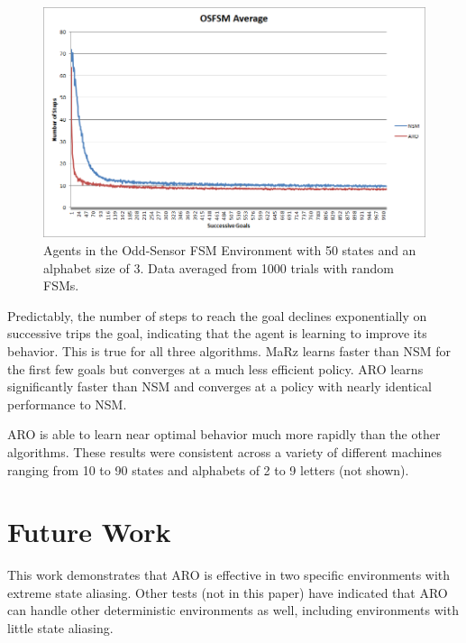 \documentclass[letterpaper]{article} %
\begin{document}
\begin{figure}[t]
	\centering
	\includegraphics[width=0.9\columnwidth]{OSFSMGraph.png} %
	\caption{Agents in the Odd-Sensor FSM Environment with 50 states and an alphabet size of 3. Data averaged from 1000 trials with random FSMs.}
	\label{fig5}
\end{figure}

Predictably, the number of steps to reach the goal declines
exponentially on successive trips the goal, indicating that the agent
is learning to improve its behavior.  This is true for all three
algorithms. MaRz learns faster than NSM for the first few goals but
converges at a much less efficient policy.  ARO learns significantly
faster than NSM and converges at a policy with nearly identical
performance to NSM.

ARO is able to learn near optimal behavior much more rapidly than the
other algorithms.  These results were consistent across a variety of
different machines ranging from 10 to 90 states and alphabets of 2 to
9 letters (not shown).

\section{Future Work}

This work demonstrates that ARO is effective in two specific
environments with extreme state aliasing. Other tests (not in this
paper) have indicated that ARO can handle other deterministic
environments as well, including environments with little state
aliasing.
\end{document}
